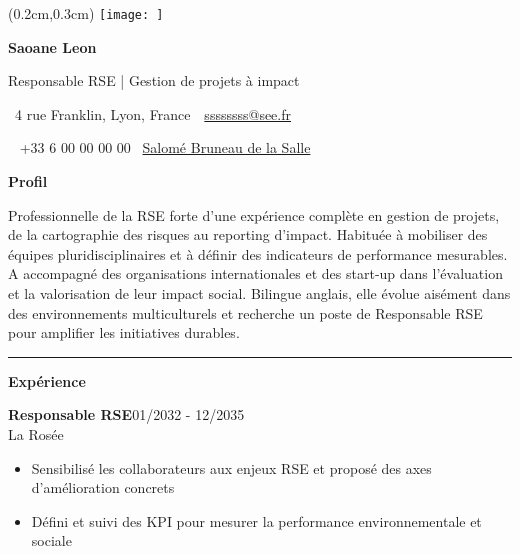 \documentclass[a4paper]{article}
\renewcommand{\colorbox}[2]{#2}%
\newcommand{\fullrule}{\hspace{-1.5cm}\rule{\paperwidth}{0.4pt}}
\newcommand{\cvsection}[1]{%
  \vspace{6pt}\textbf{\Large #1}\par\vspace{2pt}}
\begin{document}
\ifx\relax\relax\else
\begin{textblock*}{4cm}(0.2cm,0.3cm)
  \texttt{[image: ]}
\end{textblock*}
 \fi
\begin{center}
  {\fontsize{44pt}{24pt}\selectfont\bfseries Saoane Leon}

  \bigskip
  {\Large Responsable RSE | Gestion de projets à impact}

  \bigskip\bigskip
  \faMapMarker~4 rue Franklin, Lyon, France\ 
  \quad\faEnvelope~\href{mailto:ssssssss@see.fr}{ssssssss@see.fr}

  \bigskip
  \faPhone~ +33 6 00 00 00 00
  \quad \faLinkedin\ \href{Salomé Bruneau de la Salle}{Salomé Bruneau de la Salle}
 

  
\end{center}
 \vspace{0.6cm}
\cvsection{Profil}
\vspace{0.3cm}
Professionnelle de la RSE forte d’une expérience complète en gestion de projets, de la cartographie des risques au reporting d’impact. Habituée à mobiliser des équipes pluridisciplinaires et à définir des indicateurs de performance mesurables. A accompagné des organisations internationales et des start-up dans l’évaluation et la valorisation de leur impact social. Bilingue anglais, elle évolue aisément dans des environnements multiculturels et recherche un poste de Responsable RSE pour amplifier les initiatives durables.

\medskip\fullrule

\cvsection{Expérience}
\vspace{0.3cm}
\colorbox{maincolor}{%
  \begin{minipage}{\linewidth}
    \noindent
    \textbf{Responsable RSE}\hfill 01/2032 - 12/2035\\
    La Rosée\\[-0.3em]
    \begin{itemize}[leftmargin=*]
      \item Sensibilisé les collaborateurs aux enjeux RSE et proposé des axes d’amélioration concrets \item Défini et suivi des KPI pour mesurer la performance environnementale et sociale
    \end{itemize}
  \end{minipage}}
\end{document}
